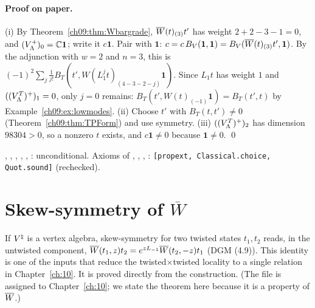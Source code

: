 \paragraph{Proof on paper.} (i) By Theorem~\ref{ch09:thm:Wbargrade}, $\overline{W}(t)_{(3)}t'$ has weight
$2+2-3-1=0$, and $(V_{\Lambda}^{+})_0={\mathbb{C}}\mathbf1$; write it $c\mathbf1$. Pair with $\mathbf1$:
$c=c\,B_V(\mathbf1,\mathbf1)=B_V(\overline{W}(t)_{(3)}t',\mathbf1)$. By the adjunction with $w=2$ and $n=3$,
this is $(-1)^2\sum_j\frac1{j!}B_T(t',W(L_1^jt)_{(4-3-2-j)}\mathbf1)$. Since $L_1t$ has weight $1$ and
$((V_{\Lambda}^{T})^{+})_1=0$, only $j=0$ remains: $B_T(t',W(t)_{(-1)}\mathbf1)=B_T(t',t)$ by
Example~\ref{ch09:ex:lowmodes}. (ii) Choose $t'$ with $B_T(t,t')\neq0$ (Theorem~\ref{ch09:thm:TPForm})
and use symmetry. (iii) $((V_{\Lambda}^{T})^{+})_2$ has dimension $98304>0$, so a nonzero $t$ exists, and
$c\mathbf1\neq0$ because $\mathbf1\neq0$. \qed

\begin{status}
, , ,
, ,
: unconditional. Axioms of ,
, , :
\texttt{[propext, Classical.choice, Quot.sound]} (rechecked).
\end{status}

\section{Skew-symmetry of \texorpdfstring{$\overline{W}$}{Wbar}}\label{ch09:sec:skew}

If ${V^{\natural}}$ is a vertex algebra, skew-symmetry for two twisted states $t_1,t_2$ reads, in the
untwisted component, $\overline{W}(t_1,z)t_2=e^{zL_{-1}}\overline{W}(t_2,-z)t_1$ (DGM (4.9)). This identity is
one of the inputs that reduce the twisted$\times$twisted locality to a single relation in
Chapter~\ref{ch:10}. It is proved directly from the construction. (The file
 is assigned to Chapter~\ref{ch:10}; we state the theorem here
because it is a property of $\overline{W}$.)

